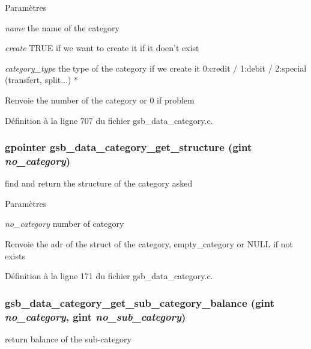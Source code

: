 \begin{DoxyParams}{Paramètres}
\item[{\em name}]the name of the category \item[{\em create}]TRUE if we want to create it if it doen't exist \item[{\em category\_\-type}]the type of the category if we create it 0:credit / 1:debit / 2:special (transfert, split...) $\ast$ \end{DoxyParams}
\begin{DoxyReturn}{Renvoie}
the number of the category or 0 if problem 
\end{DoxyReturn}


Définition à la ligne 707 du fichier gsb\_\-data\_\-category.c.

\subsubsection[{gsb\_\-data\_\-category\_\-get\_\-structure}]{\setlength{\rightskip}{0pt plus 5cm}gpointer gsb\_\-data\_\-category\_\-get\_\-structure (gint {\em no\_\-category})}\label{gsb__data__category_8c_a1ea1662771313b5e9800d380eed970d2}
find and return the structure of the category asked


\begin{DoxyParams}{Paramètres}
\item[{\em no\_\-category}]number of category\end{DoxyParams}
\begin{DoxyReturn}{Renvoie}
the adr of the struct of the category, empty\_\-category or NULL if not exists 
\end{DoxyReturn}


Définition à la ligne 171 du fichier gsb\_\-data\_\-category.c.

\subsubsection[{gsb\_\-data\_\-category\_\-get\_\-sub\_\-category\_\-balance}]{ gsb\_\-data\_\-category\_\-get\_\-sub\_\-category\_\-balance (gint {\em no\_\-category}, \/  gint {\em no\_\-sub\_\-category})}\label{gsb__data__category_8c_aeac932813d0fb3d2a96433c47f84360d}
return balance of the sub-\/category


